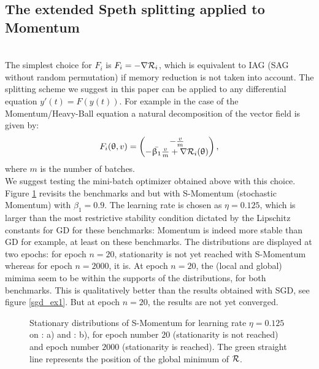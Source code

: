 \documentclass[article,authoryear,jmlmc]{beg_32}             %
\begin{document}
\subsection{The extended Speth splitting applied to Momentum}
\label{mom}
~~\\
The simplest choice for $F_i$ is $F_i=-\nabla \mathcal{R}_i$, which is equivalent to IAG (SAG without random permutation) if memory reduction is not taken into account. %
	The splitting scheme we suggest in this paper can be applied to any differential equation $y'(t)=F(y(t))$. For example in the case of the Momentum/Heavy-Ball equation \cite{momentum_sutskever_RNN,Polyak,polyak_momentum_stability,continuous_general} a natural decomposition of the vector field is given by:
	\begin{equation*}
		F_i(\uptheta,v) = 
		\begin{pmatrix}
                  -\frac{v}{m} \\
                        -{\bar{\upbeta_1}}\frac{v}{m}+\nabla \mathcal{R}_i(\uptheta)
		\end{pmatrix},
	\end{equation*}
        where $m$ is the number of batches.\\ 
        We suggest testing the mini-batch optimizer obtained above with this choice. Figure \ref{mom_ex1_ex2} revisits the benchmarks \exOne and \exTwo but with S-Momentum (stochastic Momentum) with $\beta_1=0.9$. 
        The learning rate is chosen as $\eta=0.125$, which is larger than the most restrictive stability condition dictated by the Lipschitz constants for GD for these benchmarks:
        Momentum is indeed more stable than GD for example, at least on these benchmarks. 
        The distributions are displayed at two epochs: for epoch $n=20$, stationarity is not yet reached with S-Momentum whereas for epoch $n=2000$, it is.  
        At epoch $n=20$, the (local and global) mimima seem to be within the supports of the distributions, for both benchmarks. This 
        is qualitatively better than the results obtained with SGD, see figure \ref{sgd_ex1}. 
        But at epoch $n=20$, the results are not yet converged.  
\begin{figure}[!h]
	\centering
        \scalebox{0.60}{}
	\scalebox{0.60}{}
        \caption{Stationary distributions of S-Momentum for learning rate $\eta=0.125$ on \exOne: a) and \exTwo: b), for epoch number $20$ (stationarity is not reached) and epoch number $2000$ (stationarity is reached). The green straight line represents the position of the global minimum of $\mathcal{R}$.}
	\label{mom_ex1_ex2}
\end{figure}
\end{document}
